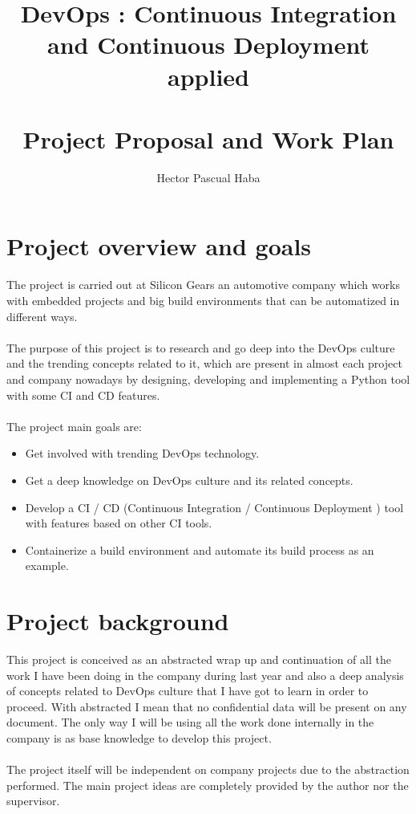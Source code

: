 \documentclass[a4paper]{article}
\title{\textbf{DevOps : Continuous Integration and Continuous Deployment applied} \\~\\
\large \textbf{Project Proposal and Work Plan}}
\author{Hector Pascual Haba}
\begin{document}
\maketitle 

\section{Project overview and goals}
The project is carried out at Silicon Gears an automotive company which works with embedded projects and big build environments that can be automatized in different ways.
\\~\\
The purpose of this project is to research and go deep into the DevOps culture and the trending concepts related to it, which are present in almost each project and company nowadays by designing, developing and implementing a Python tool with some CI and CD features.
\\~\\
The project main goals are:
\begin{itemize}
	\item Get involved with trending DevOps technology.
	\item Get a deep knowledge on DevOps culture and its related concepts.
	\item Develop a CI / CD (Continuous Integration / Continuous Deployment ) tool with features based on other CI tools.
	\item Containerize a build environment and automate its build process as an example.
\end{itemize}


\section{Project background}

This project is conceived as an abstracted wrap up and continuation of all the work I have been doing in the company during last year and also a deep analysis of concepts related to DevOps culture that I have got to learn in order to proceed. With abstracted I mean that no confidential data will be present on any document. The only way I will be using all the work done internally in the company is as base knowledge to develop this project.
\\~\\
The project itself will be independent on company projects due to the abstraction performed. 
The main project ideas are completely provided by the author nor the supervisor.
\end{document}
